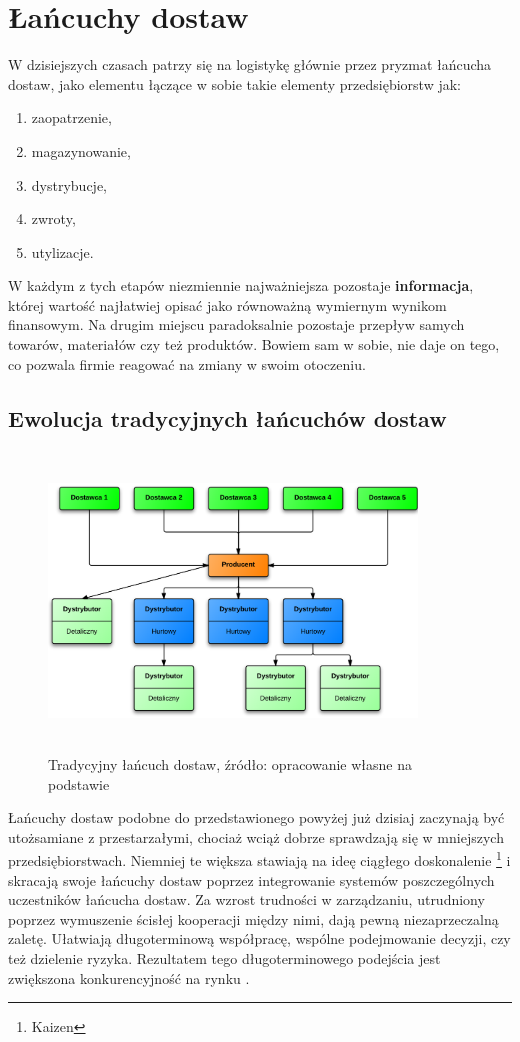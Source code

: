 \section{Łańcuchy dostaw}\label{c2:supply_chains}
	W dzisiejszych czasach patrzy się na logistykę 
	głównie przez pryzmat łańcucha dostaw, jako
	elementu łączące w sobie takie elementy przedsiębiorstw jak:
	\begin{enumerate}
		\item zaopatrzenie,
		\item magazynowanie,
		\item dystrybucje,
		\item zwroty,
		\item utylizacje.
	\end{enumerate}
	W każdym z tych etapów niezmiennie najważniejsza 
	pozostaje \textbf{informacja}, której wartość najłatwiej
	opisać jako równoważną wymiernym wynikom finansowym. 
	Na drugim miejscu paradoksalnie pozostaje przepływ
	samych towarów, materiałów czy też produktów. 
	Bowiem sam w sobie, nie daje on tego, co pozwala
	firmie reagować na zmiany w swoim otoczeniu.
	\subsection{Ewolucja tradycyjnych łańcuchów dostaw}
		\begin{figure}[t]
			\centering
			\includegraphics[width=370px, height=300px]{images/BasicSupplyChain}
			\caption[Schemat budowy prostego łańcucha dostaw]{
				Tradycyjny łańcuch dostaw, źródło: opracowanie własne na podstawie \cite{zarzadzanie_lancuchem_dostaw_w_dobie_gospodarki_elektroniczej}
			}
		\end{figure}
		Łańcuchy dostaw podobne do przedstawionego powyżej już dzisiaj 
		zaczynają być utożsamiane z przestarzałymi, chociaż
		wciąż dobrze sprawdzają się w mniejszych przedsiębiorstwach. 
		Niemniej te większa stawiają na ideę ciągłego doskonalenie
		\footnote{Kaizen} i skracają swoje łańcuchy dostaw poprzez integrowanie 
		systemów poszczególnych uczestników łańcucha dostaw.
		Za wzrost trudności w zarządzaniu, utrudniony poprzez wymuszenie 
		ścisłej kooperacji między nimi, dają pewną niezaprzeczalną
		zaletę. Ułatwiają długoterminową współpracę, wspólne podejmowanie 
		decyzji, czy też dzielenie ryzyka. Rezultatem tego długoterminowego
		podejścia jest zwiększona konkurencyjność na rynku \cite{zarzadzanie_lancuchem_dostaw_w_dobie_gospodarki_elektroniczej}.\\
		
